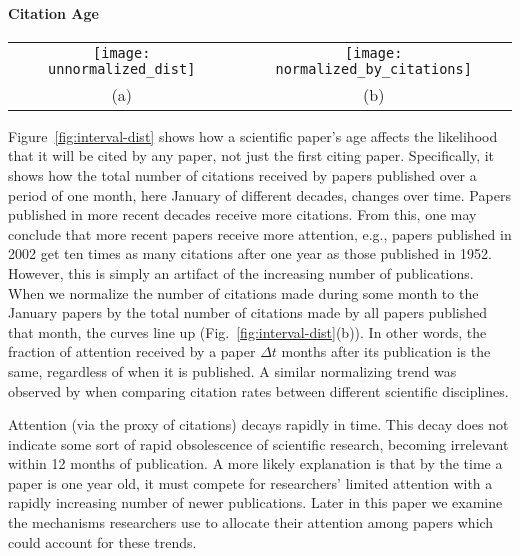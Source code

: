 \documentclass[10pt]{bmc_article}
\newcommand{\remove}[1]{}
\newenvironment{bmcformat}{\baselineskip20pt\sloppy\setboolean{publ}{false}}{\baselineskip20pt\sloppy}
\begin{document}
\begin{bmcformat}
\paragraph{Citation Age}
\begin{figure*}[htb] %
   \centering
   \begin{tabular}{cc}
   \texttt{[image: unnormalized\_dist]} &
   \texttt{[image: normalized\_by\_citations]}
\\
   (a) & (b)
   \end{tabular}
   \caption{Likelihood of getting cited vs paper's age.  (a) Number of citations made to papers published in the month of January in different decades vs time. An older paper is much less likely to get cited than a younger paper, but more more recent papers appear to get more citations overall. (b) Same data, but  with number of citations made during some month to Jan papers normalized by the  total number of citations made that month.  }
   \label{fig:interval-dist}
\end{figure*}



Figure~\ref{fig:interval-dist} shows how a scientific paper's age affects the likelihood that it will be cited by any paper, not just the first citing paper. Specifically, it shows how the total number of citations received by papers published over a period of one month, here January of different decades, changes over time.
Papers published in more recent decades receive more citations. From this, one may conclude that more recent papers receive more attention, e.g., papers published in 2002 get ten times as many citations after one year as those published in 1952. However, this is simply an artifact of the increasing number of publications. When we normalize the number of citations made during some month to the January papers by the total number of citations made by all papers published that month, the curves line up (Fig.~\ref{fig:interval-dist}(b)). In other words, the fraction of \remove{all citations made to} attention received by a paper $\Delta t$ months after its publication is the same, regardless of when it is published. {A similar normalizing trend was observed by \cite{Radicchi08unversality} when comparing citation rates between different scientific disciplines.}

Attention (via the proxy of citations) decays rapidly in time. This decay does not indicate some sort of rapid obsolescence of scientific research, becoming irrelevant within 12 months of publication. A more likely explanation is that by the time a paper is one year old, it must compete for researchers' limited attention with a rapidly increasing number of newer publications. Later in this paper we examine the mechanisms researchers use to allocate their attention among papers which could account for these trends.


\end{bmcformat}
\end{document}
